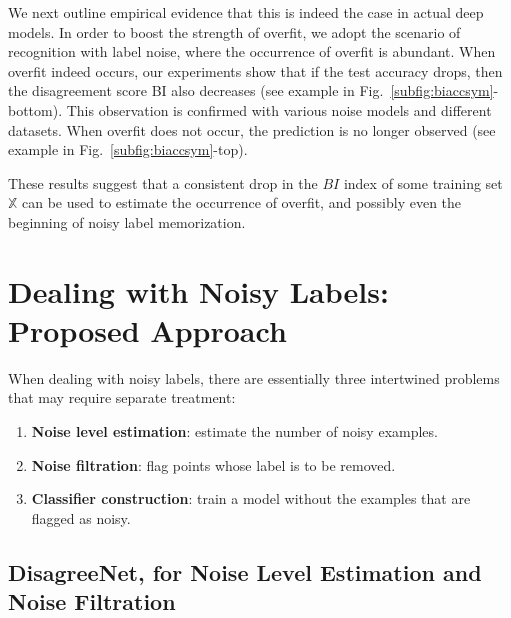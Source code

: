 \documentclass{article}
\newcommand{\iX}{\mathbb{X}}
\begin{document}
We next outline empirical evidence that this is indeed the case in actual deep models. In order to boost the strength of overfit, we adopt the scenario of recognition with label noise, where the occurrence of overfit is abundant. When overfit indeed occurs, our experiments show that if the test accuracy drops, then the disagreement score BI also decreases (see example in Fig.~\ref{subfig:biaccsym}-bottom). This observation is confirmed with various noise models and different datasets. When overfit does not occur, the prediction is no longer observed (see example in Fig.~\ref{subfig:biaccsym}-top).

These results suggest that a consistent drop in the $BI$ index of some training set $\iX$ can be used to estimate the occurrence of overfit, and possibly even the beginning of noisy label memorization. %





\section{Dealing with Noisy Labels: Proposed Approach}
\label{sec:approach}

When dealing with noisy labels, there are essentially three intertwined problems that may require separate treatment:
\begin{enumerate}[leftmargin=0.65cm,noitemsep]
\item	\textbf{Noise level estimation}: estimate the number of noisy examples.
\item	\textbf{Noise filtration}: flag points whose label is to be removed.
\item	\textbf{Classifier construction}: train a model without the examples that are flagged as noisy.%
\end{enumerate}


\subsection{DisagreeNet, for Noise Level Estimation and Noise Filtration}
\label{sec:noise-est-fli}
\end{document}
